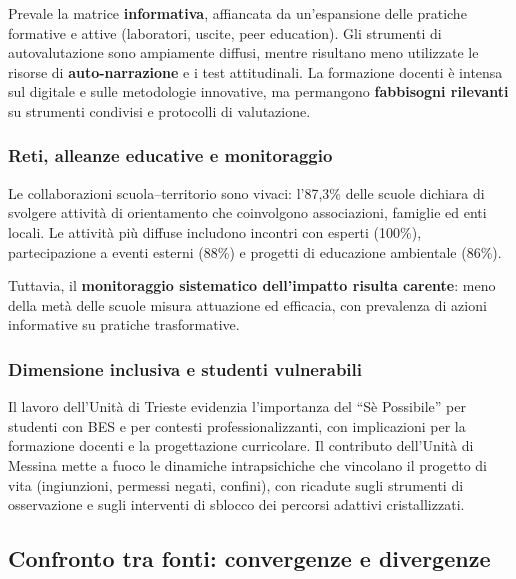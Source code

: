 \documentclass[12pt,a4paper]{article}
\begin{document}
Prevale la matrice \textbf{informativa}, affiancata da un'espansione delle pratiche formative e attive (laboratori, uscite, peer education). Gli strumenti di autovalutazione sono ampiamente diffusi, mentre risultano meno utilizzate le risorse di \textbf{auto-narrazione} e i test attitudinali. La formazione docenti \`e intensa sul digitale e sulle metodologie innovative, ma permangono \textbf{fabbisogni rilevanti} su strumenti condivisi e protocolli di valutazione.

\subsubsection{Reti, alleanze educative e monitoraggio}

Le collaborazioni scuola--territorio sono vivaci: l'87,3\% delle scuole dichiara di svolgere attivit\`a di orientamento che coinvolgono associazioni, famiglie ed enti locali. Le attivit\`a pi\`u diffuse includono incontri con esperti (100\%), partecipazione a eventi esterni (88\%) e progetti di educazione ambientale (86\%).

Tuttavia, il \textbf{monitoraggio sistematico dell'impatto risulta carente}: meno della met\`a delle scuole misura attuazione ed efficacia, con prevalenza di azioni informative su pratiche trasformative.

\subsubsection{Dimensione inclusiva e studenti vulnerabili}

Il lavoro dell'Unit\`a di Trieste evidenzia l'importanza del ``S\`e Possibile'' per studenti con BES e per contesti professionalizzanti, con implicazioni per la formazione docenti e la progettazione curricolare. Il contributo dell'Unit\`a di Messina mette a fuoco le dinamiche intrapsichiche che vincolano il progetto di vita (ingiunzioni, permessi negati, confini), con ricadute sugli strumenti di osservazione e sugli interventi di sblocco dei percorsi adattivi cristallizzati.

\subsection{Confronto tra fonti: convergenze e divergenze}
\end{document}
